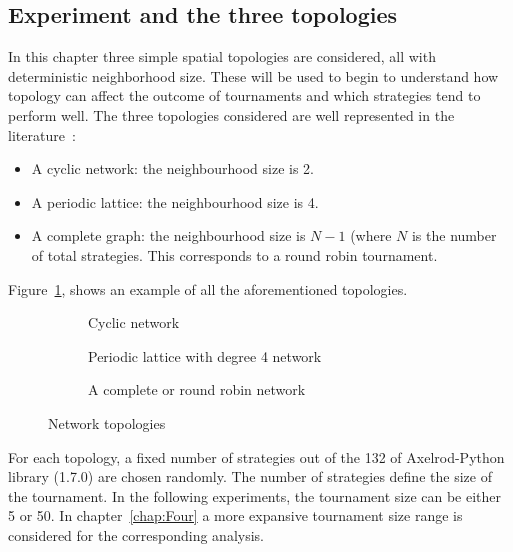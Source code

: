 \subsection{Experiment and the three topologies}
In this chapter three simple spatial topologies are considered, all with
deterministic neighborhood size. These will be used to begin to understand how
topology can affect the outcome of tournaments
and which strategies tend to perform well. The three topologies considered are
well represented in the literature~\cite{Axelrod1980a,Szabo2007,Lutz2013}:
\begin{itemize}
	\item A cyclic network: the neighbourhood size is 2.~\cite{Szabo2007}
	\item A periodic lattice: the neighbourhood size is 4.~\cite{Lutz2013}
	\item A complete graph: the neighbourhood size is \(N-1\) (where \(N\) is
	      the number of total strategies. This corresponds to a round robin
	      tournament.~\cite{Axelrod1980a}
\end{itemize}

Figure~\ref{fig:networks}, shows an example of all the aforementioned topologies.

\begin{figure}[!hbtp]
	\centering
	\begin{subfigure}[h]{0.45\textwidth}
		\centering
		
		\caption{Cyclic network}
	\end{subfigure}
	\hfill
	\begin{subfigure}[h]{0.52\textwidth}\centering
		\centering
		
		\caption{Periodic lattice with degree 4 network}
	\end{subfigure}
	\hfill
	\begin{subfigure}[h]{0.52\textwidth}\centering
		\centering
		
		\caption{A complete or round robin network}
	\end{subfigure}
	\caption{Network topologies}
	\label{fig:networks}
\end{figure}

For each topology, a fixed number of strategies out of the 132 of Axelrod-Python
library (1.7.0) are chosen randomly. The number of strategies define the size of the
tournament. In the following experiments, the tournament size can be either
5 or 50. In chapter~\ref{chap:Four} a more expansive tournament size range is
considered for the corresponding analysis.


